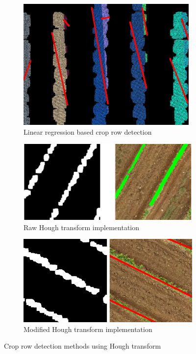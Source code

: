 \documentclass[conference]{IEEEtran}
\begin{document}
	\begin{figure}[t]
		\centering
		\begin{subfigure}{\linewidth}
			\centering
			\includegraphics[width=0.5\linewidth]{Kmeans_Row_Result.png}
			\caption{Linear regression based crop row detection}
			\label{fig_Linear_Regression}
		\end{subfigure}
		
		\vspace{0.5cm}
		
		\begin{subfigure}{\linewidth}
			\centering
			\includegraphics[width=0.7\linewidth]{Hough initial2.png}
			\caption{Raw Hough transform implementation}
			\label{fig_Hough_Init}
		\end{subfigure}
		
		\vspace{0.5cm} %
		
		\begin{subfigure}{\linewidth}
			\centering
			\includegraphics[width=0.7\linewidth]{Hough Revised2.png}
			\caption{Modified Hough transform implementation}
			\label{fig_Hough_mod}
		\end{subfigure}
		
		\caption{Crop row detection methods using Hough transform \cite{b5}}
		\label{fig:comparison}
	\end{figure}
	
\end{document}
